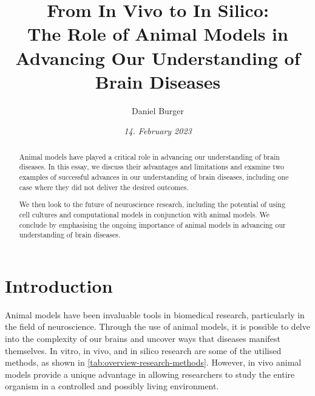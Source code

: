 \documentclass[10pt]{article}
\title{\textbf{From In Vivo to In Silico:} \\ The Role of Animal Models in Advancing Our Understanding of Brain Diseases}
\author[ ]{Daniel Burger}
\affil[ ]{\textbf{King's College London}}
\affil[ ]{\href{mailto:daniel.burger@kcl.ac.uk}{daniel.burger@kcl.ac.uk}}
\date{\textit{14. February 2023}}
\begin{document}

\maketitle
\thispagestyle{empty}

\begin{sloppypar} %
  \begin{abstract}
    Animal models have played a critical role in advancing our understanding of brain diseases. In this essay, we discuss their advantages and limitations and examine two examples of successful advances in our understanding of brain diseases, including one case where they did not deliver the desired outcomes.

    We then look to the future of neuroscience research, including the potential of using cell cultures and computational models in conjunction with animal models. We conclude by emphasising the ongoing importance of animal models in advancing our understanding of brain diseases.

  \end{abstract}
  \pagebreak

  \tableofcontents
  \pagebreak

  \listoffigures
  \listoftables
  \pagebreak


  \doublespacing

  \section{Introduction}
  \label{sec:introduction}

  Animal models have been invaluable tools in biomedical research, particularly in the field of neuroscience. Through the use of animal models, it is possible to delve into the complexity of our brains and uncover ways that diseases manifest themselves. In vitro, in vivo, and in silico research are some of the utilised methods, as shown in \autoref{tab:overview-research-methods}. However, in vivo animal models provide a unique advantage in allowing researchers to study the entire organism in a controlled and possibly living environment.


\end{sloppypar}
\end{document}
